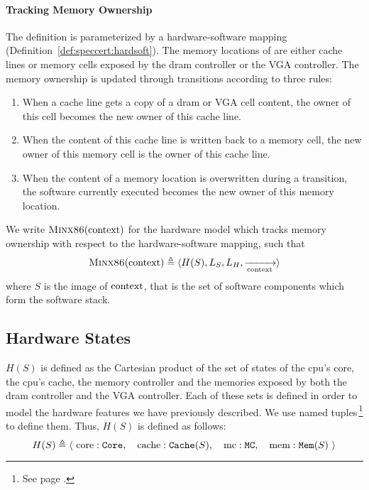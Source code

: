 \paragraph{Tracking Memory Ownership}
%
The  definition is parameterized by a hardware-software
mapping  (Definition~\ref{def:speccert:hardsoft}).
%
The memory locations of  are either cache lines or memory
cells exposed by the \ac{dram} controller or the VGA controller.
%
The memory ownership is updated through transitions according to three rules:
%
\begin{enumerate}
\item When a cache line gets a copy of a \ac{dram} or VGA cell content, the
  owner of this cell becomes the new owner of this cache line.
%
\item When the content of this cache line is written back to a memory cell, the
  new owner of this memory cell is the owner of this cache line.
%
\item When the content of a memory location is overwritten during a transition,
  the software currently executed becomes the new owner of this memory location.
%
\end{enumerate}

\begin{definition}
  \label{def:speccert2:minx86}
  We write $\textsc{Minx86}(\mathrm{context})$ for the hardware model which
  tracks memory ownership with respect to the  hardware-software
  mapping, such that
%
  \[
    \textsc{Minx86}(\mathrm{context}) \triangleq \langle H(S), L_S, L_H,
    \xrightarrow[\mathrm{context}]{} \rangle
  \]
  where $S$ is the image of $\mathrm{context}$, that is the set of software
  components which form the software stack.
\end{definition}

\subsection{Hardware States}

$H(S)$ is defined as the Cartesian product of the set of states of the
\ac{cpu}'s core, the \ac{cpu}'s cache, the memory controller and the memories
exposed by both the \ac{dram} controller and the VGA controller.
%
Each of these sets is defined in order to model the hardware features we have
previously described.
%
We use named tuples\,\footnote{See page \pageref{frontmatter:notations}.} to
define them.
%
Thus, $H(S)$ is defined as follows:
%
\[
  H(S) \triangleq \left<\ \mathrm{core}: \texttt{Core},\quad\mathrm{cache}:
  \texttt{Cache}(S),\quad\mathrm{mc}: \texttt{MC},\quad\mathrm{mem}: \texttt{Mem}(S)
  \ \right>
\]

